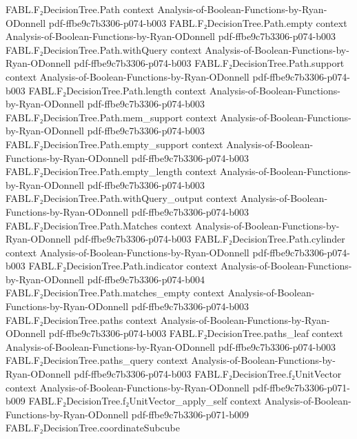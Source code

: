 \begin{theorem}
\proofstep
  {FABL.F₂DecisionTree.Path}
  {context}
  {Analysis-of-Boolean-Functions-by-Ryan-ODonnell}
  {pdf-ffbe9c7b3306-p074-b003}
\proofstep
  {FABL.F₂DecisionTree.Path.empty}
  {context}
  {Analysis-of-Boolean-Functions-by-Ryan-ODonnell}
  {pdf-ffbe9c7b3306-p074-b003}
\proofstep
  {FABL.F₂DecisionTree.Path.withQuery}
  {context}
  {Analysis-of-Boolean-Functions-by-Ryan-ODonnell}
  {pdf-ffbe9c7b3306-p074-b003}
\proofstep
  {FABL.F₂DecisionTree.Path.support}
  {context}
  {Analysis-of-Boolean-Functions-by-Ryan-ODonnell}
  {pdf-ffbe9c7b3306-p074-b003}
\proofstep
  {FABL.F₂DecisionTree.Path.length}
  {context}
  {Analysis-of-Boolean-Functions-by-Ryan-ODonnell}
  {pdf-ffbe9c7b3306-p074-b003}
\proofstep
  {FABL.F₂DecisionTree.Path.mem_support}
  {context}
  {Analysis-of-Boolean-Functions-by-Ryan-ODonnell}
  {pdf-ffbe9c7b3306-p074-b003}
\proofstep
  {FABL.F₂DecisionTree.Path.empty_support}
  {context}
  {Analysis-of-Boolean-Functions-by-Ryan-ODonnell}
  {pdf-ffbe9c7b3306-p074-b003}
\proofstep
  {FABL.F₂DecisionTree.Path.empty_length}
  {context}
  {Analysis-of-Boolean-Functions-by-Ryan-ODonnell}
  {pdf-ffbe9c7b3306-p074-b003}
\proofstep
  {FABL.F₂DecisionTree.Path.withQuery_output}
  {context}
  {Analysis-of-Boolean-Functions-by-Ryan-ODonnell}
  {pdf-ffbe9c7b3306-p074-b003}
\proofstep
  {FABL.F₂DecisionTree.Path.Matches}
  {context}
  {Analysis-of-Boolean-Functions-by-Ryan-ODonnell}
  {pdf-ffbe9c7b3306-p074-b003}
\proofstep
  {FABL.F₂DecisionTree.Path.cylinder}
  {context}
  {Analysis-of-Boolean-Functions-by-Ryan-ODonnell}
  {pdf-ffbe9c7b3306-p074-b003}
\proofstep
  {FABL.F₂DecisionTree.Path.indicator}
  {context}
  {Analysis-of-Boolean-Functions-by-Ryan-ODonnell}
  {pdf-ffbe9c7b3306-p074-b004}
\proofstep
  {FABL.F₂DecisionTree.Path.matches_empty}
  {context}
  {Analysis-of-Boolean-Functions-by-Ryan-ODonnell}
  {pdf-ffbe9c7b3306-p074-b003}
\proofstep
  {FABL.F₂DecisionTree.paths}
  {context}
  {Analysis-of-Boolean-Functions-by-Ryan-ODonnell}
  {pdf-ffbe9c7b3306-p074-b003}
\proofstep
  {FABL.F₂DecisionTree.paths_leaf}
  {context}
  {Analysis-of-Boolean-Functions-by-Ryan-ODonnell}
  {pdf-ffbe9c7b3306-p074-b003}
\proofstep
  {FABL.F₂DecisionTree.paths_query}
  {context}
  {Analysis-of-Boolean-Functions-by-Ryan-ODonnell}
  {pdf-ffbe9c7b3306-p074-b003}
\proofstep
  {FABL.F₂DecisionTree.f₂UnitVector}
  {context}
  {Analysis-of-Boolean-Functions-by-Ryan-ODonnell}
  {pdf-ffbe9c7b3306-p071-b009}
\proofstep
  {FABL.F₂DecisionTree.f₂UnitVector_apply_self}
  {context}
  {Analysis-of-Boolean-Functions-by-Ryan-ODonnell}
  {pdf-ffbe9c7b3306-p071-b009}
\proofstep
  {FABL.F₂DecisionTree.coordinateSubcube}

\end{theorem}
